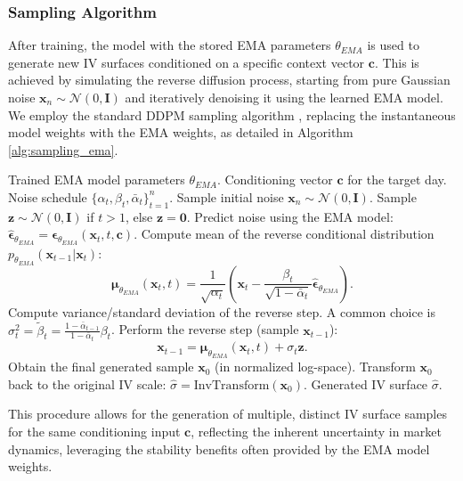 \documentclass{article}
\begin{document}
\subsubsection{Sampling Algorithm}

After training, the model with the stored EMA parameters $\theta_{EMA}$ is used to generate new IV surfaces conditioned on a specific context vector $\mathbf{c}$. This is achieved by simulating the reverse diffusion process, starting from pure Gaussian noise $\mathbf{x}_n \sim \mathcal{N}(0, \mathbf{I})$ and iteratively denoising it using the learned EMA model. We employ the standard DDPM sampling algorithm \citep{Ho_Jain_Abbeel_2020}, replacing the instantaneous model weights with the EMA weights, as detailed in Algorithm \ref{alg:sampling_ema}.
\begin{algorithm}[h!]
\caption{Sampling Conditional IV Surfaces using EMA Model}
\label{alg:sampling_ema}
\begin{algorithmic}[1]
\Require Trained EMA model parameters $\theta_{EMA}$.
\Require Conditioning vector $\mathbf{c}$ for the target day.
\Require Noise schedule $\{\alpha_t, \beta_t, \bar{\alpha}_t\}_{t=1}^n$.
\State Sample initial noise $\mathbf{x}_n \sim \mathcal{N}(0, \mathbf{I})$.
    \State Sample $\mathbf{z} \sim \mathcal{N}(0, \mathbf{I})$ if $t > 1$, else $\mathbf{z} = \mathbf{0}$.
    \State Predict noise using the EMA model: $\hat{\boldsymbol{\epsilon}}_{\theta_{EMA}} = \boldsymbol{\epsilon}_{\theta_{EMA}}(\mathbf{x}_t, t, \mathbf{c})$.
    \State Compute mean of the reverse conditional distribution $p_{\theta_{EMA}}(\mathbf{x}_{t-1}|\mathbf{x}_t)$:
           \[ \boldsymbol{\mu}_{\theta_{EMA}}(\mathbf{x}_t, t) = \frac{1}{\sqrt{\alpha_t}} \left( \mathbf{x}_t - \frac{\beta_t}{\sqrt{1-\bar{\alpha}_t}} \hat{\boldsymbol{\epsilon}}_{\theta_{EMA}} \right). \]
    \State Compute variance/standard deviation of the reverse step. A common choice is $\sigma_t^2 = \tilde{\beta}_t = \frac{1-\bar{\alpha}_{t-1}}{1-\bar{\alpha}_t} \beta_t$.
    \State Perform the reverse step (sample $\mathbf{x}_{t-1}$):
           \[ \mathbf{x}_{t-1} = \boldsymbol{\mu}_{\theta_{EMA}}(\mathbf{x}_t, t) + \sigma_t \mathbf{z}.
           \]
\EndFor
\State Obtain the final generated sample $\mathbf{x}_0$ (in normalized log-space).
\State Transform $\mathbf{x}_0$ back to the original IV scale: $\hat{\sigma} = \text{InvTransform}(\mathbf{x}_0)$.
\State \Return Generated IV surface $\hat{\sigma}$.
\end{algorithmic}
\end{algorithm}
This procedure allows for the generation of multiple, distinct IV surface samples for the same conditioning input $\mathbf{c}$, reflecting the inherent uncertainty in market dynamics, leveraging the stability benefits often provided by the EMA model weights.
\end{document}
